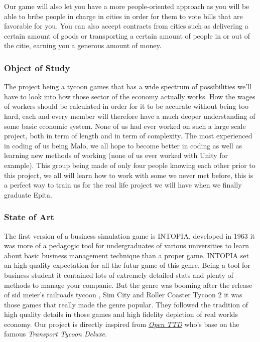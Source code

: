 \documentclass[a4paper, 11pt] {article}
\begin{document}
    Our game will also let you have a more people-oriented approach as you will be able to bribe people in charge in cities in order for them to vote bills that are favorable for you. You can also accept contracts from cities such as delivering a certain amount of goods or transporting a certain amount of people in or out of the citie, earning you a generous amount of money.
    \newline

    \subsubsection{Object of Study}

    \par
    The project being a tycoon games that has a wide spectrum of possibilities we’ll have to look into how those sector of the economy actually works. How the wages of workers should be calculated in order for it to be accurate without being too hard, each and every member will therefore have a much deeper understanding of some basic economic system. None of us had ever worked on such a large scale project, both in term of length and in term of complexity. The most experienced in coding of us
    being Malo, we all hope to become better in coding as well as learning new methods of working (none of us ever worked with Unity for example). This group being made of only four people knowing each other prior to this project, we all will learn how to work with some we never met before, this is a perfect way to train us for the real life project we will have when we finally graduate Epita.\par

    \subsubsection{State of Art}

    \par
    The first version of a business simulation game is INTOPIA, developed in 1963 it was more of a pedagogic tool for undergraduates of various universities to learn about basic business management technique than a proper game. INTOPIA set an high quality expectation for all the futur game of this genre. Being a tool for business student it contained lots of extremely detailed stats and plenty of methods to manage your companie. But the genre was booming after the release of sid meier's
    railroads tycoon , Sim City  and Roller Coaster Tycoon 2 it was those games that really made the genre popular. They followed the tradition of high quality details in those games and high fidelity depiction of real worlds economy. Our project is directly inspired from \href{www.openttd.org}{\textit{Open TTD}} who’s base on the famous \textit{Transport Tycoon Deluxe}.\par
    
\end{document}
